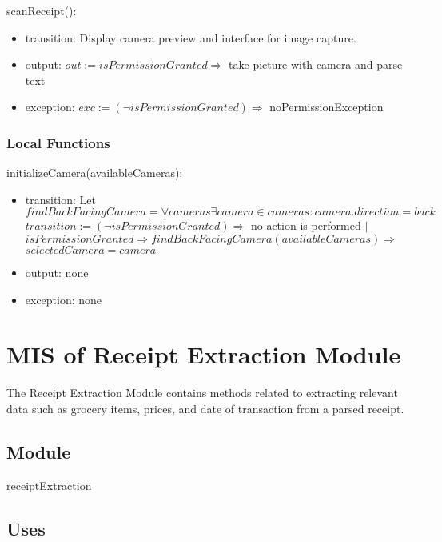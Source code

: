 \documentclass[12pt, titlepage]{article}
\begin{document}
\noindent scanReceipt():
\begin{itemize}
  \item transition: Display camera preview and interface for image capture.
  \item output: $out := isPermissionGranted \Rightarrow$ take picture with camera and parse text
  \item exception: $exc := (\neg isPermissionGranted) \Rightarrow$ noPermissionException
\end{itemize}

\subsubsection{Local Functions}

\noindent initializeCamera(availableCameras):
\begin{itemize}
  \item transition: Let $findBackFacingCamera = \forall cameras \exists camera \in cameras : camera.direction = back$ \\
                    $transition := (\neg isPermissionGranted) \Rightarrow$ no action is performed $|$\\
                    $isPermissionGranted \Rightarrow findBackFacingCamera(availableCameras) \Rightarrow $ \\
                    $selectedCamera = camera$
  \item output: none
  \item exception: none
\end{itemize}

\newpage

\section{MIS of Receipt Extraction Module} \label{mExtraction}

The Receipt Extraction Module contains methods related to extracting relevant data such as grocery items,
prices, and date of transaction from a parsed receipt.

\subsection{Module}

receiptExtraction

\subsection{Uses}
\end{document}
